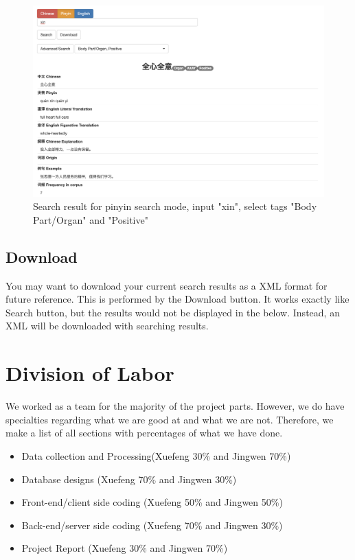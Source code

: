 \documentclass[11pt]{article} %
\begin{document}
\begin{figure}[htbp]
\begin{center}
\includegraphics[width=16cm]{result.png}
\caption{Search result for pinyin search mode, input "xin", select tags "Body Part/Organ" and "Positive"}
\label{default}
\end{center}
\end{figure}

\subsection{Download}
\indent You may want to download your current search results as a XML format for future reference. This is performed by the Download button. It works exactly like Search button, but the results would not be displayed in the below. Instead, an XML will be downloaded with searching results.

\section{Division of Labor}

\indent We worked as a team for the majority of the project parts. However, we do have specialties regarding what we are good at and what we are not. Therefore, we make a list of all sections with percentages of what we have done.

\begin{itemize}
  \item Data collection and Processing(Xuefeng 30\% and Jingwen 70\%)
    \item Database designs (Xuefeng 70\% and Jingwen 30\%)
    \item Front-end/client side coding (Xuefeng 50\% and Jingwen 50\%)
    \item Back-end/server side coding (Xuefeng 70\% and Jingwen 30\%)
    \item Project Report (Xuefeng 30\% and Jingwen 70\%)
\end{itemize}
\end{document}
